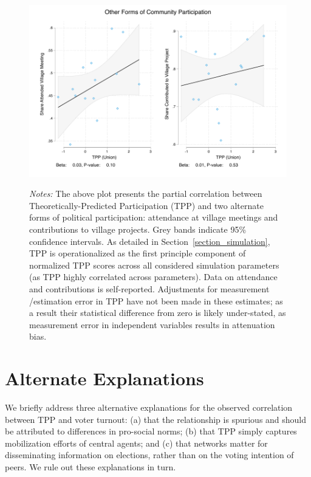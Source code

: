 \documentclass[12pt]{article}
\begin{document}
\begin{figure}[!h]
	\begin{center}
	    \caption{}\label{figure_otherparticipation}
    		\includegraphics[width=\textwidth]{../3_results/network_and_other_participation}
    \end{center}
	\scriptsize{\emph{Notes:}  The above plot presents the partial correlation between Theoretically-Predicted Participation (TPP) and two alternate forms of political participation: attendance at village meetings and contributions to village projects. Grey bands indicate 95\% confidence intervals. As detailed in Section~\ref{section_simulation}, TPP is operationalized as the first principle component of normalized TPP scores across all considered simulation parameters (as TPP highly correlated across parameters). Data on attendance and contributions is self-reported. Adjustments for measurement /estimation error in TPP have not been made in these estimates; as a result their statistical difference from zero is likely under-stated, as measurement error in independent variables results in attenuation bias.}
\end{figure}

\section{Alternate Explanations}

We briefly address three alternative explanations for the observed correlation between TPP and voter turnout: (a) that the relationship is spurious and should be attributed to differences in pro-social norms; (b) that TPP simply captures mobilization efforts of central agents; and (c) that networks matter for disseminating information on elections, rather than on the voting intention of peers. We rule out these explanations in turn.
\end{document}
